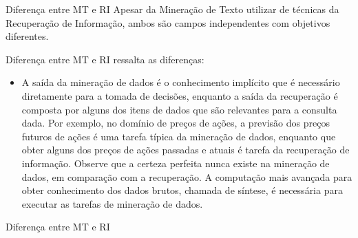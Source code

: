 \documentclass[%
  10pt,%
  aspectratio = 169,%
  compress,%
  t,%
]{beamer}%
\begin{document}
    \begin{frame}[fragile = singleslide]{}{Diferença entre MT e RI}
        Apesar da Mineração de Texto utilizar de técnicas da Recuperação de Informação, ambos são campos independentes com objetivos diferentes.

        \begin{block}{Diferença entre MT e RI}
            \cite[p.~4, tradução nossa]{Jo2018TMCIBDC} ressalta as diferenças:
            \begin{itemize}
                \item A saída da mineração de dados é o conhecimento implícito que é necessário diretamente para a tomada de decisões, enquanto a saída da recuperação é composta por alguns dos itens de dados que são relevantes para a consulta dada.
                Por exemplo, no domínio de preços de ações, a previsão dos preços futuros de ações é uma tarefa típica da mineração de dados, enquanto que obter alguns dos preços de ações passadas e atuais é tarefa da recuperação de informação.
                Observe que a certeza perfeita nunca existe na mineração de dados, em comparação com a recuperação.
                A computação mais avançada para obter conhecimento dos dados brutos, chamada de síntese, é necessária para executar as tarefas de mineração de dados.
            \end{itemize}
        \end{block}
    \end{frame}

    \begin{frame}{}{Diferença entre MT e RI}
        
    \end{frame}
\end{document}
